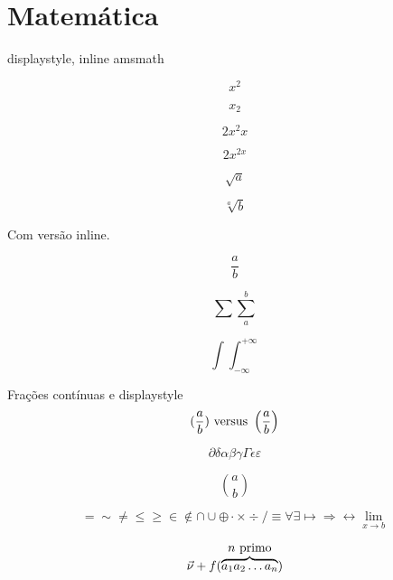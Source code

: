 \section{Matemática}

displaystyle, inline
amsmath


$$x^2$$

$$x_2$$

$$2x^2x$$

$$2x^{2x}$$

$$\sqrt{a}$$

$$\sqrt[a]b$$

Com versão inline.

$$\frac ab$$

$$\sum \sum_a^b$$

$$\int\!\!\!\int_{-\infty}^{+\infty}$$

Frações contínuas e displaystyle
$$(\frac ab) \hbox{ versus } \left(\frac ab\right)$$

$$\partial\delta\alpha\beta\gamma\Gamma\epsilon\varepsilon$$

$$a \choose b$$

$$=\sim\neq\leq\geq\in\notin\cap\cup\oplus\cdot\times\div/\equiv\forall\exists\mapsto\Rightarrow\longleftrightarrow
\lim_{x\to b}$$


$$\vec{\nu}+f(\overbrace{a_1a_2\ldots a_n}^{\hbox{$n$ primo}})$$

